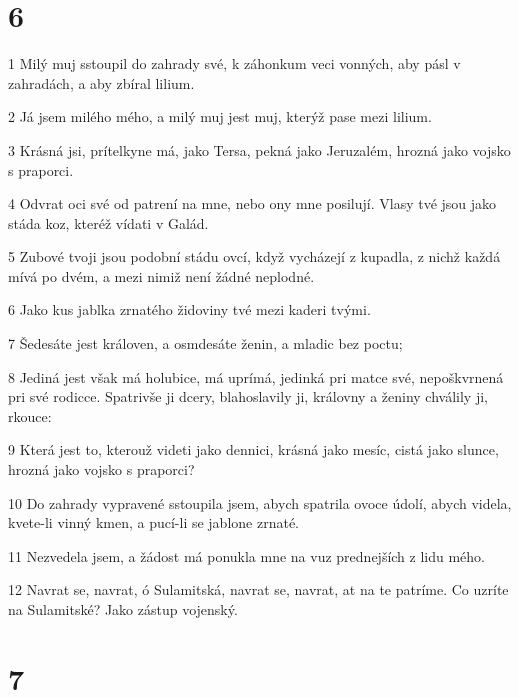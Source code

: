 \chapter{6}

\par 1 Milý muj sstoupil do zahrady své, k záhonkum veci vonných, aby pásl v zahradách, a aby zbíral lilium.
\par 2 Já jsem milého mého, a milý muj jest muj, kterýž pase mezi lilium.
\par 3 Krásná jsi, prítelkyne má, jako Tersa, pekná jako Jeruzalém, hrozná jako vojsko s praporci.
\par 4 Odvrat oci své od patrení na mne, nebo ony mne posilují. Vlasy tvé jsou jako stáda koz, kteréž vídati v Galád.
\par 5 Zubové tvoji jsou podobní stádu ovcí, když vycházejí z kupadla, z nichž každá mívá po dvém, a mezi nimiž není žádné neplodné.
\par 6 Jako kus jablka zrnatého židoviny tvé mezi kaderi tvými.
\par 7 Šedesáte jest královen, a osmdesáte ženin, a mladic bez poctu;
\par 8 Jediná jest však má holubice, má uprímá, jedinká pri matce své, nepoškvrnená pri své rodicce. Spatrivše ji dcery, blahoslavily ji, královny a ženiny chválily ji, rkouce:
\par 9 Která jest to, kterouž videti jako dennici, krásná jako mesíc, cistá jako slunce, hrozná jako vojsko s praporci?
\par 10 Do zahrady vypravené sstoupila jsem, abych spatrila ovoce údolí, abych videla, kvete-li vinný kmen, a pucí-li se jablone zrnaté.
\par 11 Nezvedela jsem, a žádost má ponukla mne na vuz prednejších z lidu mého.
\par 12 Navrat se, navrat, ó Sulamitská, navrat se, navrat, at na te patríme. Co uzríte na Sulamitské? Jako zástup vojenský.

\chapter{7}

